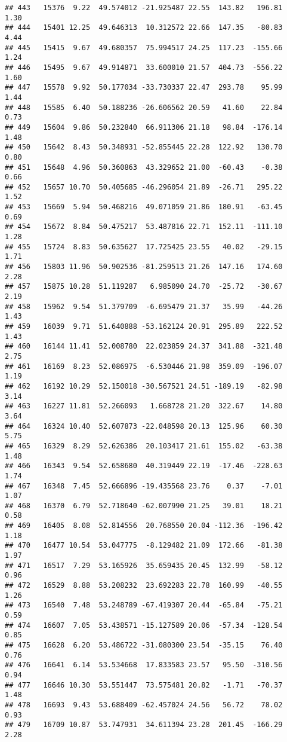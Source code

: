 \documentclass[]{article}
\begin{document}
\begin{verbatim}
## 443   15376  9.22  49.574012 -21.925487 22.55  143.82   196.81  1.30
## 444   15401 12.25  49.646313  10.312572 22.66  147.35   -80.83  4.44
## 445   15415  9.67  49.680357  75.994517 24.25  117.23  -155.66  1.24
## 446   15495  9.67  49.914871  33.600010 21.57  404.73  -556.22  1.60
## 447   15578  9.92  50.177034 -33.730337 22.47  293.78    95.99  1.44
## 448   15585  6.40  50.188236 -26.606562 20.59   41.60    22.84  0.73
## 449   15604  9.86  50.232840  66.911306 21.18   98.84  -176.14  1.48
## 450   15642  8.43  50.348931 -52.855445 22.28  122.92   130.70  0.80
## 451   15648  4.96  50.360863  43.329652 21.00  -60.43    -0.38  0.66
## 452   15657 10.70  50.405685 -46.296054 21.89  -26.71   295.22  1.52
## 453   15669  5.94  50.468216  49.071059 21.86  180.91   -63.45  0.69
## 454   15672  8.84  50.475217  53.487816 22.71  152.11  -111.10  1.28
## 455   15724  8.83  50.635627  17.725425 23.55   40.02   -29.15  1.71
## 456   15803 11.96  50.902536 -81.259513 21.26  147.16   174.60  2.28
## 457   15875 10.28  51.119287   6.985090 24.70  -25.72   -30.67  2.19
## 458   15962  9.54  51.379709  -6.695479 21.37   35.99   -44.26  1.43
## 459   16039  9.71  51.640888 -53.162124 20.91  295.89   222.52  1.43
## 460   16144 11.41  52.008780  22.023859 24.37  341.88  -321.48  2.75
## 461   16169  8.23  52.086975  -6.530446 21.98  359.09  -196.07  1.19
## 462   16192 10.29  52.150018 -30.567521 24.51 -189.19   -82.98  3.14
## 463   16227 11.81  52.266093   1.668728 21.20  322.67    14.80  3.64
## 464   16324 10.40  52.607873 -22.048598 20.13  125.96    60.30  5.75
## 465   16329  8.29  52.626386  20.103417 21.61  155.02   -63.38  1.48
## 466   16343  9.54  52.658680  40.319449 22.19  -17.46  -228.63  1.74
## 467   16348  7.45  52.666896 -19.435568 23.76    0.37    -7.01  1.07
## 468   16370  6.79  52.718640 -62.007990 21.25   39.01    18.21  0.58
## 469   16405  8.08  52.814556  20.768550 20.04 -112.36  -196.42  1.18
## 470   16477 10.54  53.047775  -8.129482 21.09  172.66   -81.38  1.97
## 471   16517  7.29  53.165926  35.659435 20.45  132.99   -58.12  0.96
## 472   16529  8.88  53.208232  23.692283 22.78  160.99   -40.55  1.26
## 473   16540  7.48  53.248789 -67.419307 20.44  -65.84   -75.21  0.59
## 474   16607  7.05  53.438571 -15.127589 20.06  -57.34  -128.54  0.85
## 475   16628  6.20  53.486722 -31.080300 23.54  -35.15    76.40  0.76
## 476   16641  6.14  53.534668  17.833583 23.57   95.50  -310.56  0.94
## 477   16646 10.30  53.551447  73.575481 20.82   -1.71   -70.37  1.48
## 478   16693  9.43  53.688409 -62.457024 24.56   56.72    78.02  0.93
## 479   16709 10.87  53.747931  34.611394 23.28  201.45  -166.29  2.28

\end{verbatim}
\end{document}
